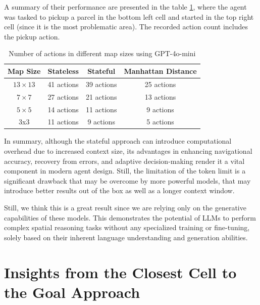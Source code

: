 A summary of their performance are presented in the table \ref{tab:svss}, where
the agent was tasked to pickup a parcel in the bottom left cell and started in
the top right cell (since it is the most problematic area). The recorded action count
includes the pickup action.

\vspace{5mm}
\begin{table}[h]
  \centering
  \begin{tabular}{c|cc|c}
    \textbf{Map Size} & \textbf{Stateless} & \textbf{Stateful} & \textbf{Manhattan Distance} \\
    \hline
    $13 \times 13$    & 41 actions         & 39 actions        & 25 actions                  \\
    $7 \times 7$      & 27 actions         & 21 actions        & 13 actions                  \\
    $5 \times 5$      & 14 actions         & 11 actions        & 9 actions                   \\
    3x3               & 11 actions         & 9 actions         & 5 actions                   \\
  \end{tabular}
  \caption{Number of actions in different map sizes using GPT-4o-mini}
  \label{tab:svss}
\end{table}
\vspace{5mm}

In summary, although the stateful approach can introduce computational overhead due
to increased context size, its advantages in enhancing navigational accuracy, recovery
from errors, and adaptive decision-making render it a vital component in modern
agent design. Still, the limitation of the token limit is a significant drawback
that may be overcome by more powerful models, that may introduce better results out
of the box as well as a longer context window.

Still, we think this is a great result since we are relying only on the
generative capabilities of these models. This demonstrates the potential of LLMs
to perform complex spatial reasoning tasks without any specialized training or fine-tuning,
solely based on their inherent language understanding and generation abilities.

\section{Insights from the Closest Cell to the Goal Approach}
\label{sec:closest_cell_to_the_goal_results}

